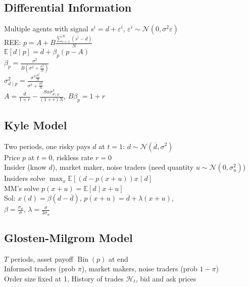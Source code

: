 	\subsection*{Differential Information}
	Multiple agents with signal $s^{i} = d + \varepsilon^{i}$, $\varepsilon^{i}\sim\mathcal{N}\left(0, \sigma^{2}\varepsilon\right)$\\
	REE: $p = A + B\frac{\sum_{i=1}^{N}\left(s^{i} - \overline{d}\right)}{N}$\\
	$\mathbb{E}\left[d\mid p\right] = \overline{d} + \beta_{p}\left(p - A\right)$\\
	$\beta_{p} = \frac{\sigma^{2}}{B\left(\sigma^{2} + \frac{\sigma^{2}_{\varepsilon}}{N}\right)}$\\
	$\sigma^{2}_{d\mid p} = \frac{\sigma^{2}\frac{\sigma^{2}_{\varepsilon}}{N}}{\sigma^{2} + \frac{\sigma^{2}_{\varepsilon}}{N}}$\\
	$A = \frac{\overline{d}}{1 + r} - \frac{S\alpha\sigma^{2}_{d\mid p}}{\left(1 + r\right)N}$, $B\beta_{p} = 1 + r$
	
	\subsection*{Kyle Model}
	Two periods, one risky pays $d$ at $t=1$: $d\sim\mathcal{N}\left(\overline{d}, \sigma^{2}\right)$\\
	Price $p$ at $t = 0$, riskless rate $r = 0$\\
	Insider (know $d$), market maker, noise traders (need quantity $u\sim\mathcal{N}\left(0, \sigma^{2}_{u}\right)$)\\
	Insiders solve $\max_{x}\mathbb{E}\left[\left(d - p\left(x + u\right)\right)x\mid d\right]$\\
	MM's solve $p\left(x + u\right) = \mathbb{E}\left[d\mid x + u\right]$\\
	Sol: $x\left(d\right) = \beta\left(d - \overline{d}\right)$, $p\left(x + u\right) = \overline{d} + \lambda\left(x + u\right)$,\\
	$\beta = \frac{\sigma_{u}}{\sigma}$, $\lambda = \frac{\sigma}{2\sigma_{u}}$
	
	\subsection*{Glosten-Milgrom Model}
	$T$ periods, asset payoff $\operatorname{Bin}\left(p\right)$ at end\\
	Informed traders (prob $\pi$), market makers, noise traders (prob $1 - \pi$)\\
	Order size fixed at 1, History of trades $\mathscr{H}_{t}$, bid and ask prices
	